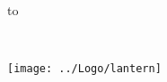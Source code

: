 \begin{titlepage}
\null\vskip-47pt
\hbox to 

\setcounter{page}{1}                      %

\vspace*{60mm}


{\selectfont
\begin{center}
 \\
\end{center}}

\begin{center}
\texttt{[image: ../Logo/lantern]}
\end{center}

\vfill
\end{titlepage}

\thispagestyle{empty}
\cleardoublepage

